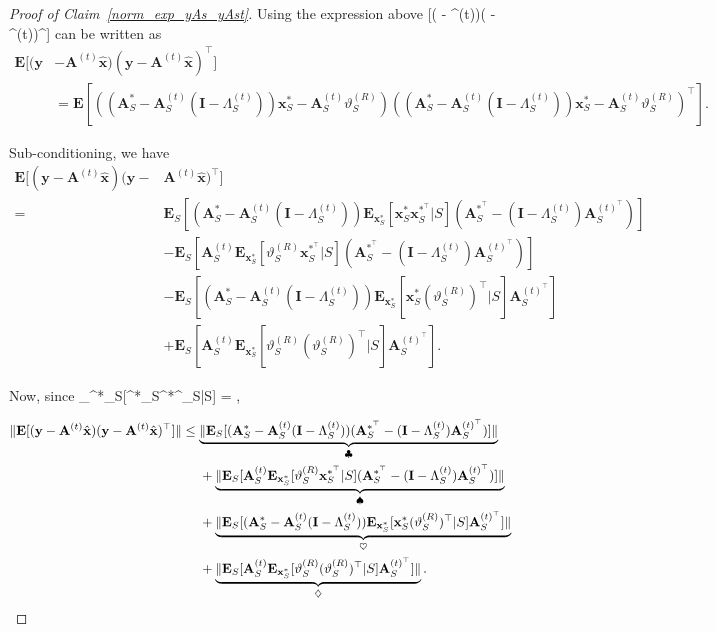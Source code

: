 \documentclass{article}
\def\[#1\]{{$#1$}}
\def\b#1{{\mathbf{#1}}}
\begin{document}
\begin{proof}[Proof of Claim~\ref{norm_exp_yAs_yAst}]
     Using the expression above \[\b{E}[(\b{y} - \b{A}^{(t)}\hat{\b{x}})(\b{y} - \b{A}^{(t)}\hat{\b{x}})^\top] \] can be written as
	\begin{align*}
	\b{E}[(\b{y} &- \b{A}^{(t)}\hat{\b{x}})(\b{y} - \b{A}^{(t)}\hat{\b{x}})^\top] \\
	&= \b{E}[((\b{A}^*_S  - \b{A}^{(t)}_S(\b{I} - \Lambda^{(t)}_S))\b{x}^*_S  - \b{A}^{(t)}_S\vartheta^{(R)}_S)((\b{A}^*_S  - \b{A}^{(t)}_S(\b{I} - \Lambda^{(t)}_S))\b{x}^*_S  - \b{A}^{(t)}_S\vartheta^{(R)}_S)^\top].

	\end{align*}
	
	Sub-conditioning, we have
	\begin{align*}
	\b{E}[(\b{y} - \b{A}^{(t)}\hat{\b{x}})(\b{y} - &\b{A}^{(t)}\hat{\b{x}})^\top]\\
= &\b{E}_S[(\b{A}^*_S  - \b{A}^{(t)}_S(\b{I} - \Lambda^{(t)}_S))\b{E}_{\b{x}^*_S}[\b{x}^*_S\b{x}^{*^\top}_S|S](\b{A}^{*^\top}_S  - (\b{I} - \Lambda^{(t)}_S)\b{A}^{(t)^\top}_S)] \\
&- \b{E}_S[\b{A}^{(t)}_S\b{E}_{\b{x}^*_S}[\vartheta^{(R)}_S\b{x}^{*^\top}_S|S](\b{A}^{*^\top}_S  - (\b{I} - \Lambda^{(t)}_S)\b{A}^{(t)^\top}_S)] \\
	&- \b{E}_S[(\b{A}^*_S  - \b{A}^{(t)}_S(\b{I} - \Lambda^{(t)}_S))\b{E}_{\b{x}^*_S}[\b{x}^*_S(\vartheta^{(R)}_S)^\top|S]\b{A}^{(t)^\top}_S] \\
	&+ \b{E}_S[\b{A}^{(t)}_S\b{E}_{\b{x}^*_S}[\vartheta^{(R)}_S(\vartheta^{(R)}_S)^\top|S]\b{A}^{(t)^\top}_S].
	\end{align*}
			
	Now, since \[\b{E}_{\b{x}^*_S}[\b{x}^*_S\b{x}^{*^\top}_S|S] = \b{I}\],








	\begin{align}\label{iht:mat_W_var}
	\|\b{E}[(\b{y} - \b{A}^{(t)}\hat{\b{x}})(\b{y} - \b{A}^{(t)}\hat{\b{x}})^\top]\|\notag
&\leq \underbrace{\|\b{E}_S[(\b{A}^*_S  - \b{A}^{(t)}_S(\b{I} - \Lambda^{(t)}_S))(\b{A}^{*^\top}_S  - (\b{I} - \Lambda^{(t)}_S)\b{A}^{(t)^\top}_S)]\|}_{\clubsuit} \\
&~~~~+\underbrace{\| \b{E}_S[\b{A}^{(t)}_S\b{E}_{\b{x}^*_S}[\vartheta^{(R)}_S\b{x}^{*^\top}_S|S](\b{A}^{*^\top}_S  - (\b{I} - \Lambda^{(t)}_S)\b{A}^{(t)^\top}_S)]\|}_{\spadesuit} \notag \\
	&~~~~+\underbrace{\| \b{E}_S[(\b{A}^*_S  - \b{A}^{(t)}_S(\b{I} - \Lambda^{(t)}_S))\b{E}_{\b{x}^*_S}[\b{x}^*_S(\vartheta^{(R)}_S)^\top|S]\b{A}^{(t)^\top}_S]\|}_{\heartsuit} \notag\\
	 &~~~~+ \underbrace{\|\b{E}_S[\b{A}^{(t)}_S\b{E}_{\b{x}^*_S}[\vartheta^{(R)}_S(\vartheta^{(R)}_S)^\top|S]\b{A}^{(t)^\top}_S]\|}_{\diamondsuit} .
	\end{align}
	










\end{proof}
\end{document}
